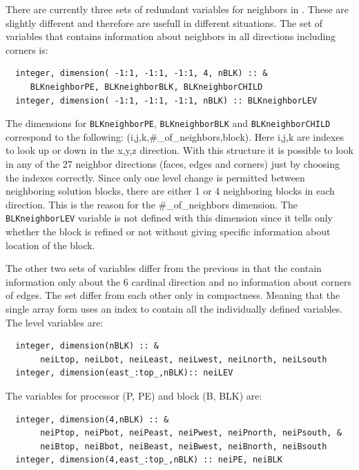 There are currently three sets of redundant variables for 
neighbors in \BATSRUS.  These are slightly different and therefore are
usefull in different situations.  The set of variables that
contains information about neighbors in all directions including
corners is:
\begin{verbatim}
  integer, dimension( -1:1, -1:1, -1:1, 4, nBLK) :: &
     BLKneighborPE, BLKneighborBLK, BLKneighborCHILD
  integer, dimension( -1:1, -1:1, -1:1, nBLK) :: BLKneighborLEV
\end{verbatim}
The dimensions for  {\tt BLKneighborPE}, {\tt BLKneighborBLK}
and  {\tt BLKneighborCHILD}
correspond to the following: (i,j,k,\#\_of\_neighbors,block). Here i,j,k are
indexes to look up or down in the x,y,z direction.  With this
structure it is possible to look in any of the 27 neighbor directions 
(faces, edges and corners)
just by choosing the indexes correctly.  
Since only one level change is permitted
between neighboring solution blocks, there are either 1 or 4 
neighboring blocks in each  direction. This is the
reason for the \#\_of\_neighbors dimension.
The {\tt  BLKneighborLEV} variable is not defined with this 
dimension since it tells only whether the block is refined
 or not without giving
specific information about location of the block.

The other two sets of variables differ from the previous in that
the contain information only about the 6 cardinal direction and 
no information about corners of edges.  The set differ from
each other only in compactness.  Meaning that the single array
form uses an index to contain all the individually defined variables.
The level variables are:
\begin{verbatim}
  integer, dimension(nBLK) :: &
       neiLtop, neiLbot, neiLeast, neiLwest, neiLnorth, neiLsouth
  integer, dimension(east_:top_,nBLK):: neiLEV
\end{verbatim}
The variables for processor (P, PE) and block (B, BLK) are:
\begin{verbatim}
  integer, dimension(4,nBLK) :: &
       neiPtop, neiPbot, neiPeast, neiPwest, neiPnorth, neiPsouth, &
       neiBtop, neiBbot, neiBeast, neiBwest, neiBnorth, neiBsouth
  integer, dimension(4,east_:top_,nBLK) :: neiPE, neiBLK
\end{verbatim}

